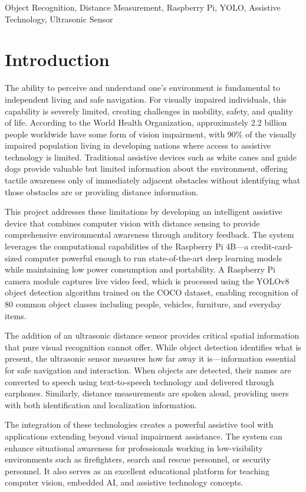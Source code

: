 \documentclass[conference]{IEEEtran}
\begin{document}
\begin{IEEEkeywords}
Object Recognition, Distance Measurement, Raspberry Pi, YOLO, Assistive Technology, Ultrasonic Sensor
\end{IEEEkeywords}

\section{Introduction}
The ability to perceive and understand one's environment is fundamental to independent living and safe navigation. For visually impaired individuals, this capability is severely limited, creating challenges in mobility, safety, and quality of life. According to the World Health Organization, approximately 2.2 billion people worldwide have some form of vision impairment, with 90\% of the visually impaired population living in developing nations where access to assistive technology is limited. Traditional assistive devices such as white canes and guide dogs provide valuable but limited information about the environment, offering tactile awareness only of immediately adjacent obstacles without identifying what those obstacles are or providing distance information.

This project addresses these limitations by developing an intelligent assistive device that combines computer vision with distance sensing to provide comprehensive environmental awareness through auditory feedback. The system leverages the computational capabilities of the Raspberry Pi 4B—a credit-card-sized computer powerful enough to run state-of-the-art deep learning models while maintaining low power consumption and portability. A Raspberry Pi camera module captures live video feed, which is processed using the YOLOv8 object detection algorithm trained on the COCO dataset, enabling recognition of 80 common object classes including people, vehicles, furniture, and everyday items.

The addition of an ultrasonic distance sensor provides critical spatial information that pure visual recognition cannot offer. While object detection identifies what is present, the ultrasonic sensor measures how far away it is—information essential for safe navigation and interaction. When objects are detected, their names are converted to speech using text-to-speech technology and delivered through earphones. Similarly, distance measurements are spoken aloud, providing users with both identification and localization information.

The integration of these technologies creates a powerful assistive tool with applications extending beyond visual impairment assistance. The system can enhance situational awareness for professionals working in low-visibility environments such as firefighters, search and rescue personnel, or security personnel. It also serves as an excellent educational platform for teaching computer vision, embedded AI, and assistive technology concepts.
\end{document}
